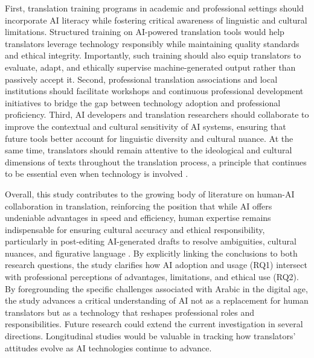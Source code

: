\documentclass[english]{textolivre}
\begin{document}
First, translation training programs in academic and professional settings should incorporate AI literacy while fostering critical awareness of linguistic and cultural limitations. Structured training on AI-powered translation tools would help translators leverage technology responsibly while maintaining quality standards and ethical integrity. Importantly, such training should also equip translators to evaluate, adapt, and ethically supervise machine-generated output rather than passively accept it. Second, professional translation associations and local institutions should facilitate workshops and continuous professional development initiatives to bridge the gap between technology adoption and professional proficiency. Third, AI developers and translation researchers should collaborate to improve the contextual and cultural sensitivity of AI systems, ensuring that future tools better account for linguistic diversity and cultural nuance. At the same time, translators should remain attentive to the ideological and cultural dimensions of texts throughout the translation process, a principle that continues to be essential even when technology is involved \cite{BadahEtAl2026Recontextualization}.

Overall, this study contributes to the growing body of literature on human-AI collaboration in translation, reinforcing the position that while AI offers undeniable advantages in speed and efficiency, human expertise remains indispensable for ensuring cultural accuracy and ethical responsibility, particularly in post-editing AI-generated drafts to resolve ambiguities, cultural nuances, and figurative language \cite{ShehabBadah2026ConversationalImplicatures}. By explicitly linking the conclusions to both research questions, the study clarifies how AI adoption and usage (RQ1) intersect with professional perceptions of advantages, limitations, and ethical use (RQ2). By foregrounding the specific challenges associated with Arabic in the digital age, the study advances a critical understanding of AI not as a replacement for human translators but as a technology that reshapes professional roles and responsibilities. Future research could extend the current investigation in several directions. Longitudinal studies would be valuable in tracking how translators’ attitudes evolve as AI technologies continue to advance.


\printbibliography\label{sec-bib}
\end{document}
